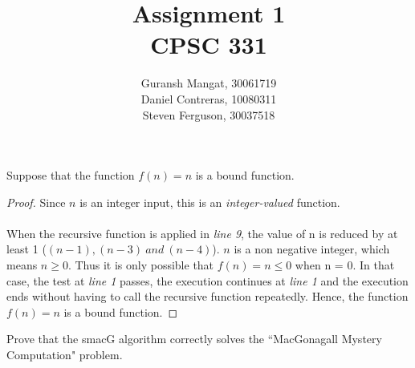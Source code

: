 \documentclass[12pt]{article}
\newenvironment{problem}[2][Problem]{\begin{trivlist}
\item[\hskip \labelsep {\bfseries #1}\hskip \labelsep {\bfseries #2.}]}{\end{trivlist}}
\begin{document}
 

\title{Assignment 1 \\ CPSC 331} %
\author{Guransh Mangat, 30061719 \\ Daniel Contreras, 10080311 \\ Steven Ferguson, 30037518\\}
\date{}


 
\maketitle{}

\newpage


\begin{problem}{1}
    Suppose that the function $f(n)=n$ is a bound function.
\end{problem}

\begin{proof}
    Since $n$ is an integer input, this is an \textit{integer-valued} function.\\ \\ When the 
    recursive function is applied in \textit{line 9}, the value of n is reduced by at least 1 
    ($(n-1), (n-3) \ and \ (n-4)$). \newline \newline $n$ is a non negative integer, which means 
    $n \geq 0$. Thus it is only possible that $ f(n) = n \leq 0$ when n = 0. In that case, the test 
    at \textit{line 1} passes, the execution continues at \textit{line 1} and the execution ends 
    without having to call the recursive function repeatedly. \newline \newline Hence, the function 
    $f(n) = n$ is a bound function. 
\end{proof}


\begin{problem}{2}
    Prove that the smacG algorithm correctly solves the ``MacGonagall Mystery Computation" problem.
\end{problem}
\end{document}
